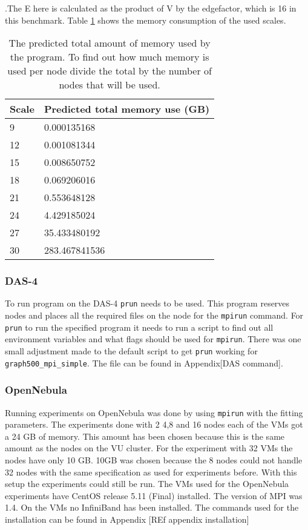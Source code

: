 .The E here is calculated as the product of V by the edgefactor, which is 16 in this benchmark. Table \ref{tab:calculation memory consumption} shows the memory consumption of the used scales.
\begin{table} [!h]
\begin{center}
\begin{tabular}{|l|l|}
\hline
Scale & Predicted total memory use (GB) \\ \hline
9 &  0.000135168 \\ \hline
12 & 0.001081344 \\ \hline
15 & 0.008650752 \\ \hline
18 & 0.069206016 \\ \hline
21 & 0.553648128 \\ \hline
24 & 4.429185024 \\ \hline
27 & 35.433480192 \\ \hline
30 & 283.467841536 \\ \hline
\end{tabular}
\end{center}

\caption{The predicted total amount of memory used by the program. To find out how much memory is used per node divide the total by the number of nodes that will be used.}
\label{tab:calculation memory consumption}
\end{table}
    
\subsubsection{DAS-4}
To run program on the DAS-4 \texttt{prun} needs to be used. This program reserves nodes and places all the required files on the node for the \texttt{mpirun} command. For \texttt{prun} to run the specified program it needs to run a script to find out all environment variables and what flags should be used for \texttt{mpirun}. There was one small adjustment made to the default script to get \texttt{prun} working for \texttt{graph500\_mpi\_simple}. The file can be found in Appendix[DAS command].

\subsubsection{OpenNebula}
Running experiments on OpenNebula was done by using \texttt{mpirun} with the fitting parameters. The experiments done with 2 4,8 and 16 nodes each of the VMs got a 24 GB of memory. This amount has been chosen because this is the same amount as the nodes on the VU cluster. For the experiment with 32 VMs the nodes have only 10 GB. 10GB was chosen because the 8 nodes could not handle 32 nodes with the same specification as used for experiments before. With this setup the experiments could still be run. The VMs used for the OpenNebula experiments have CentOS release 5.11 (Final) installed. The version of MPI was 1.4. On the VMs no InfiniBand has been installed. The commands used for the installation can be found in Appendix [REf appendix installation]

